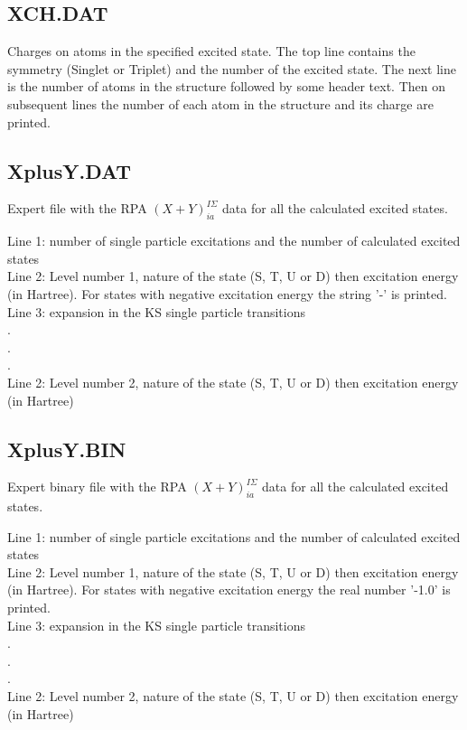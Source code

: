 \subsection{XCH.DAT}

Charges on atoms in the specified excited state. The top line contains the
symmetry (Singlet or Triplet) and the number of the excited state. The next line
is the number of atoms in the structure followed by some header text. Then on
subsequent lines the number of each atom in the structure and its charge are
printed.

\subsection{XplusY.DAT}

Expert file with the RPA  $(X+Y)^{I\Sigma}_{ia}$ data for all the calculated
excited states.

Line 1: number of single particle excitations and the number of calculated
excited states\\
Line 2: Level number 1, nature of the state (S, T, U or D) then excitation
energy (in Hartree). For states with negative excitation energy the
string '-' is printed.\\
Line 3: expansion in the KS single particle transitions\\
.\\
.\\
.\\
Line 2: Level number 2, nature of the state (S, T, U or D) then excitation
energy (in Hartree)\\

\subsection{XplusY.BIN}

Expert binary file with the RPA  $(X+Y)^{I\Sigma}_{ia}$ data for all the calculated
excited states.

Line 1: number of single particle excitations and the number of calculated
excited states\\
Line 2: Level number 1, nature of the state (S, T, U or D) then excitation
energy (in Hartree). For states with negative excitation energy the
real number '-1.0' is printed.\\
Line 3: expansion in the KS single particle transitions\\
.\\
.\\
.\\
Line 2: Level number 2, nature of the state (S, T, U or D) then excitation
energy (in Hartree)\\


